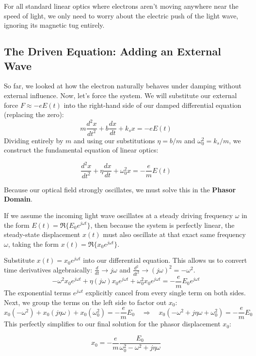 For all standard linear optics where electrons aren't moving anywhere near the speed of light, we only need to worry about the electric push of the light wave, ignoring its magnetic tug entirely.

\subsection{The Driven Equation: Adding an External Wave}
So far, we looked at how the electron naturally behaves under damping without external influence. Now, let's force the system. We will substitute our external force $F \approx -e E(t)$ into the right-hand side of our damped differential equation (replacing the zero):
\begin{equation*}
    m\frac{d^2x}{dt^2}+b\frac{dx}{dt}+k_s x = -e E(t)
\end{equation*}
Dividing entirely by $m$ and using our substitutions $\eta = b/m$ and $\omega_0^2 = k_s/m$, we construct the fundamental equation of linear optics:
\begin{keyresult}
    \begin{equation}
        \frac{d^2x}{dt^2}+\eta\frac{dx}{dt}+\omega_0^2x=-\frac{e}{m}E(t)
    \end{equation}
\end{keyresult}

Because our optical field strongly oscillates, we must solve this in the \textbf{Phasor Domain}.

If we assume the incoming light wave oscillates at a steady driving frequency $\omega$ in the form $E(t)=\Re\{E_0 e^{j\omega t}\}$, then because the system is perfectly linear, the steady-state displacement $x(t)$ must also oscillate at that exact same frequency $\omega$, taking the form $x(t)=\Re\{x_0 e^{j\omega t}\}$.

Substitute $x(t) = x_0 e^{j\omega t}$ into our differential equation. This allows us to convert time derivatives algebraically: $\frac{d}{dt} \to j\omega$ and $\frac{d^2}{dt^2} \to (j\omega)^2 = -\omega^2$.
\begin{equation*}
    -\omega^2 x_0 e^{j\omega t} + \eta (j\omega) x_0 e^{j\omega t} + \omega_0^2 x_0 e^{j\omega t} = -\frac{e}{m} E_0 e^{j\omega t}
\end{equation*}
The exponential terms $e^{j\omega t}$ explicitly cancel from every single term on both sides. Next, we group the terms on the left side to factor out $x_0$:
\begin{equation*}
    x_0(-\omega^2) + x_0(j\eta\omega) + x_0(\omega_0^2) = -\frac{e}{m} E_0 \quad \Rightarrow \quad x_0 \left(-\omega^2+j\eta\omega + \omega_0^2 \right) = -\frac{e}{m} E_0
\end{equation*}
This perfectly simplifies to our final solution for the phasor displacement $x_0$:
\begin{keyresult}
    \begin{equation}
        x_0=-\frac{e}{m}\frac{E_0}{\omega_0^2-\omega^2+j\eta\omega}
    \end{equation}
\end{keyresult}

